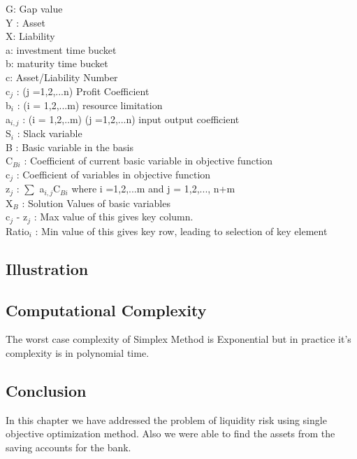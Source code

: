 G: Gap value\\
Y : Asset\\
X: Liability\\
a: investment time bucket\\
b: maturity time bucket\\
c: Asset/Liability Number\\
c$_{j}$ : (j =1,2,...n) Profit Coefficient \\
b$_{i}$ : (i = 1,2,...m) resource limitation \\
a$_{i,j}$ : (i = 1,2,..m) (j =1,2,...n) input output coefficient \\ 
S$_{i}$ : Slack variable \\ 
B : Basic variable in the basis \\ 
C$_{Bi}$ : Coefficient of current basic variable in objective function \\ 
c$_{j}$ : Coefficient of variables in objective function \\ 
z$_{j}$ : $\sum$ a$_{i,j}$C$_{Bi}$ where i =1,2,...m and j = 1,2,..., n+m \\ 
X$_{B}$ :  Solution Values of basic variables \\ 
c$_{j}$ - z$_{j}$ : Max value of this gives key column. \\ 
Ratio$_{i}$ : Min value of this gives key row, leading to selection of key element \\ 


\subsection{Illustration}



\subsection{Computational Complexity}
The worst case complexity of Simplex Method is Exponential but in practice it's complexity is in polynomial time.

\subsection{Conclusion }
In this chapter we have addressed the problem of liquidity risk using single objective optimization method. Also we were able to find the assets from the saving accounts for the bank.








